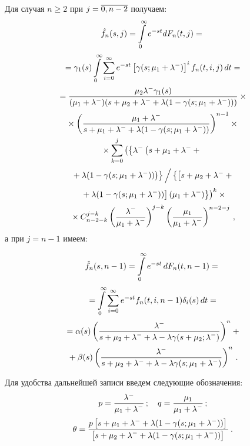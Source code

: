 \begin{multicols}{2}
Для случая $n \ge 2$ при $j\hm=\overline{0,n-2}$ получаем:
\begin{multline*}
\hat f_n(s,j)=\int\limits_{0}^\infty e^{-st} dF_n(t,j)={}\\[2pt]
{}= \gamma_1(s) \int\limits_{0}^{\infty}
\sum\limits_{i=0}^{\infty} e^{-st}
\left[\gamma(s;\mu_1 + \lambda^-)\right]^i
f_n(t,i,j)\, dt = {}\\
{}=
\displaystyle\frac{\displaystyle \mu_2 \lambda^- \gamma_1(s) \mathstrut}{\displaystyle 
(\mu_1+\lambda^-)(s + \mu_2 + \lambda^- + \lambda (1 - \gamma(s;\mu_1 + \lambda^-)))\mathstrut}\times{}\\[2pt]
{}\times
\left(\displaystyle\frac{\displaystyle \mu_1+\lambda^- \mathstrut}{\displaystyle s + \mu_1 + \lambda^- + \lambda (1 - \gamma(s;\mu_1 + \lambda^-))\mathstrut}\right)^{n-1}
\times{}
\\
{}\times
\sum\limits_{k=0}^{j} \left(
\left\{\lambda^- \left(s + \mu_1 + \lambda^- +{}\right.\right.\right.\\[2pt]
\left.\left.{}+ \lambda (1 - \gamma(s;\mu_1 + \lambda^-))\right) \right\}\Big / 
\left\{\left[s + \mu_2 + \lambda^- +{}\right.\right.\\[2pt] 
\left.\left.\left.{}+\lambda (1 - \gamma(s;\mu_1 + \lambda^-))\right]
(\mu_1+\lambda^-)\right\}\right)^{k}\times{}\\[2pt]
{}\times
C_{n-2-k}^{j-k} \left(\displaystyle\frac{\displaystyle \lambda^-\mathstrut}{\displaystyle \mu_1 + \lambda^-\mathstrut}\right)^{j-k}
          \left(\displaystyle\frac{\displaystyle \mu_1 \mathstrut}{\displaystyle \mu_1 + \lambda^-\mathstrut}\right)^{n-2-j}\,,
\end{multline*}
а при $j=n-1$ имеем:

\noindent
\begin{multline*}
\hat f_n(s,n-1)=\int\limits_{0}^\infty e^{-st} \,dF_n(t,n-1)={}
\\[2pt]
{}=
\int\limits_{0}^{\infty}\sum\limits_{i=0}^{\infty}
e^{-st} f_n(t,i,n-1) \delta_i(s)\, dt={}\\[2pt]
{}=
\alpha (s) \left (
\displaystyle\frac{\displaystyle \lambda^- \mathstrut}{\displaystyle s+\mu_2+\lambda^- + \lambda - \lambda \gamma(s+\mu_2;\lambda^-) \mathstrut}
\right )^{n}
+{}\\[2pt]
{}+\beta (s)\left (
\displaystyle\frac{\displaystyle \lambda^-\mathstrut}{\displaystyle s+\mu_2+\lambda^- + \lambda - \lambda \gamma(s; \mu_1 + \lambda^-)\mathstrut}
\right )^{n}\,.
\end{multline*}

Для удобства дальнейшей записи введем следующие обозначения:
\begin{gather*}
p=\displaystyle\frac{\displaystyle \lambda^-\mathstrut}{\displaystyle \mu_1 + \lambda^-\mathstrut}\,; \quad q = \displaystyle\frac{\displaystyle \mu_1\mathstrut}{\displaystyle \mu_1 + \lambda^-\mathstrut}\,;\\[2pt]
\theta = \displaystyle\frac{\displaystyle p \left[s + \mu_1 + \lambda^- + \lambda (1 - \gamma(s;\mu_1 + \lambda^-))\right] \mathstrut}{\displaystyle 
\left[s + \mu_2 + \lambda^- + \lambda (1 - \gamma(s;\mu_1 + \lambda^-))\right]\mathstrut}\,.
\end{gather*}


\end{multicols}
